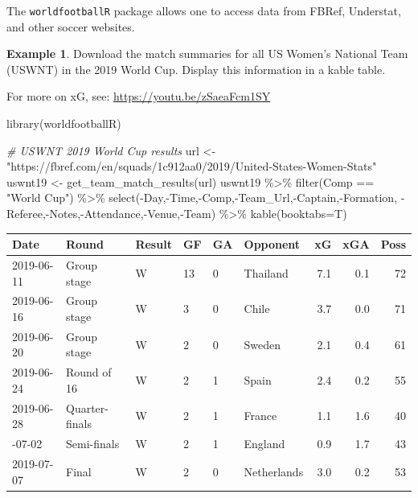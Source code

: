 \documentclass[
  11pt,
]{book}
\newenvironment{Shaded}{\begin{snugshade}}{\end{snugshade}}
\newcommand{\AttributeTok}[1]{\textcolor[rgb]{0.77,0.63,0.00}{#1}}
\newcommand{\CommentTok}[1]{\textcolor[rgb]{0.56,0.35,0.01}{\textit{#1}}}
\newcommand{\FunctionTok}[1]{\textcolor[rgb]{0.00,0.00,0.00}{#1}}
\newcommand{\NormalTok}[1]{#1}
\newcommand{\OtherTok}[1]{\textcolor[rgb]{0.56,0.35,0.01}{#1}}
\newcommand{\SpecialCharTok}[1]{\textcolor[rgb]{0.00,0.00,0.00}{#1}}
\newcommand{\StringTok}[1]{\textcolor[rgb]{0.31,0.60,0.02}{#1}}
\theoremstyle{definition}
\theoremstyle{definition}
\newtheorem{example}{Example}[chapter]
\theoremstyle{definition}
\theoremstyle{definition}
\theoremstyle{remark}
\begin{document}
The \texttt{worldfootballR} package allows one to access data from FBRef, Understat, and other soccer websites.

\begin{example}
Download the match summaries for all US Women's National Team (USWNT) in the 2019 World Cup. Display this information in a kable table.

For more on xG, see: \url{https://youtu.be/zSaeaFcm1SY}
\end{example}

\begin{Shaded}
\begin{Highlighting}[]
\FunctionTok{library}\NormalTok{(worldfootballR)}

\CommentTok{\# USWNT 2019 World Cup results}
\NormalTok{url }\OtherTok{\textless{}{-}} \StringTok{"https://fbref.com/en/squads/1c912aa0/2019/United{-}States{-}Women{-}Stats"}
\NormalTok{uswnt19 }\OtherTok{\textless{}{-}} \FunctionTok{get\_team\_match\_results}\NormalTok{(url)}
\NormalTok{uswnt19 }\SpecialCharTok{\%\textgreater{}\%} \FunctionTok{filter}\NormalTok{(Comp }\SpecialCharTok{==} \StringTok{"World Cup"}\NormalTok{) }\SpecialCharTok{\%\textgreater{}\%} 
  \FunctionTok{select}\NormalTok{(}\SpecialCharTok{{-}}\NormalTok{Day,}\SpecialCharTok{{-}}\NormalTok{Time,}\SpecialCharTok{{-}}\NormalTok{Comp,}\SpecialCharTok{{-}}\NormalTok{Team\_Url,}\SpecialCharTok{{-}}\NormalTok{Captain,}\SpecialCharTok{{-}}\NormalTok{Formation,}
         \SpecialCharTok{{-}}\NormalTok{Referee,}\SpecialCharTok{{-}}\NormalTok{Notes,}\SpecialCharTok{{-}}\NormalTok{Attendance,}\SpecialCharTok{{-}}\NormalTok{Venue,}\SpecialCharTok{{-}}\NormalTok{Team) }\SpecialCharTok{\%\textgreater{}\%} 
  \FunctionTok{kable}\NormalTok{(}\AttributeTok{booktabs=}\NormalTok{T)}
\end{Highlighting}
\end{Shaded}

\begin{tabular}{llllllrrr}
\toprule
Date & Round & Result & GF & GA & Opponent & xG & xGA & Poss\\
\midrule
2019-06-11 & Group stage & W & 13 & 0 & Thailand & 7.1 & 0.1 & 72\\
2019-06-16 & Group stage & W & 3 & 0 & Chile & 3.7 & 0.0 & 71\\
2019-06-20 & Group stage & W & 2 & 0 & Sweden & 2.1 & 0.4 & 61\\
2019-06-24 & Round of 16 & W & 2 & 1 & Spain & 2.4 & 0.2 & 55\\
2019-06-28 & Quarter-finals & W & 2 & 1 & France & 1.1 & 1.6 & 40\\
\addlinespace
2019-07-02 & Semi-finals & W & 2 & 1 & England & 0.9 & 1.7 & 43\\
2019-07-07 & Final & W & 2 & 0 & Netherlands & 3.0 & 0.2 & 53\\
\bottomrule
\end{tabular}
\end{document}
